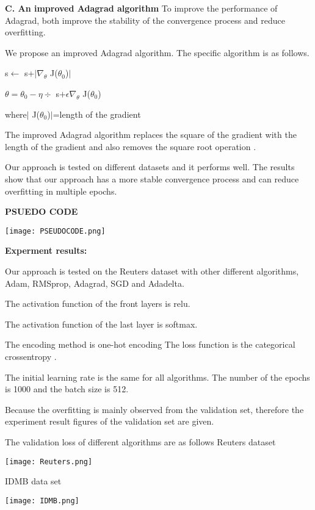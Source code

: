 \documentclass{beamer}
\begin{document}
\begin{frame}
\textbf{C. An improved Adagrad algorithm }
To improve the performance of Adagrad, both improve the stability of the convergence process and reduce overfitting. 


We propose an improved Adagrad algorithm. The specific algorithm is as follows.


s$\leftarrow $ s+$ \mid \nabla_\theta $ J($\theta_0 $)$\mid $


$\theta=\theta_0-\eta \div$ s$+\epsilon\nabla_\theta $ J($\theta_0 $)


where$ \mid$ J($\theta_0 $)$\mid $=length of the gradient
\end{frame}
\begin{frame}
The improved Adagrad algorithm replaces the square of the gradient with the length of the gradient and also removes the square root operation . 


Our approach is tested on different datasets and it performs well. The results show that our approach has a more stable convergence process and can reduce overfitting in multiple epochs.
\end{frame}
\begin{frame}
\textbf{PSUEDO CODE}


\texttt{[image: PSEUDOCODE.png]}
\end{frame}
\begin{frame}
\textbf{Experment results:}

Our approach is tested on the Reuters dataset with other different algorithms, Adam, RMSprop, Adagrad, SGD and Adadelta. 

The activation function of the front layers is relu.

The activation function of the last layer is softmax.
 
The encoding method is one-hot encoding  The loss function is the categorical crossentropy .

The initial learning rate is the same for all algorithms. The number of the epochs is 1000 and the batch size is 512. 

Because the overfitting is mainly observed from the validation set, therefore the experiment result figures of the validation set are given. 

\end{frame}
\begin{frame}
The validation loss of different algorithms are as follows
Reuters dataset

\texttt{[image: Reuters.png]} 
\end{frame}
\begin{frame}
IDMB data set 

\texttt{[image: IDMB.png]}

\end{frame}
\end{document}
